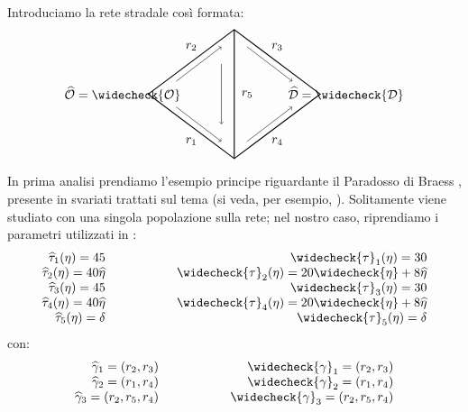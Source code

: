 Introduciamo la rete stradale così formata:
\[
\quad
\begin{tikzpicture}[scale=1.2]

\coordinate (L) at (0,0);
\coordinate (T) at (2,1.5);
\coordinate (R) at (4,0);
\coordinate (B) at (2,-1.5);

\draw[thick] (L) -- (T) -- (R) -- (B) -- cycle;
\draw[thick] (T) -- (B);

\draw[->] (0.65,0.3) -- (1.7,1.1);

\draw[->] (0.65,-0.3) -- (1.7,-1.1);

\draw[->] (2.3,1.1) -- (3.35,0.3);

\draw[->] (2.3,-1.1) -- (3.35,-0.3);

\draw[->] (1.7, 0.7) -- (1.7, -0.7);

\node at (1,1.1) {$r_2$};
\node at (1,-1.1) {$r_1$};
\node at (3,1.1) {$r_3$};
\node at (3,-1.1) {$r_4$};
\node at (2.3, 0) {$r_5$};
\node at (-0.6, 0) {$\widehat{\mathcal{O}} = \widecheck{\mathcal{O}}$};
\node at (4.6, 0) {$\widehat{\mathcal{D}} = \widecheck{\mathcal{D}}$};
\end{tikzpicture}
\quad
\]
In prima analisi prendiamo l'esempio principe riguardante il Paradosso di Braess \cite{BraessParadox}, presente in svariati trattati sul tema (si veda, per esempio, \cite{Easley_Kleinberg_2010}).
Solitamente viene studiato con una singola popolazione sulla rete; nel nostro caso, riprendiamo i parametri utilizzati in \cite[Cap. 3]{MR4911797}:
\begin{equation*}
\begin{array}{r @{\hspace{2cm}} r}

\widehat{\tau}_1(\eta) = 45 &
\widecheck{\tau}_1(\eta) = 30 \\

\widehat{\tau}_2(\eta) = 40\widehat{\eta} &
\widecheck{\tau}_2(\eta) = 20\widecheck{\eta}+8\widehat{\eta} \\

\widehat{\tau}_3(\eta) = 45 &
\widecheck{\tau}_3(\eta) = 30 \\

\widehat{\tau}_4(\eta) = 40\widehat{\eta} &
\widecheck{\tau}_4(\eta) = 20\widecheck{\eta}+8\widehat{\eta} \\

\widehat{\tau}_5(\eta) = \delta &
\widecheck{\tau}_5(\eta) = \delta
$$
\end{array}
\end{equation*}
con:
\begin{equation*}
\begin{array}{r @{\hspace{2cm}} r}

\widehat{\gamma}_1 = (r_2, r_3) &
\widecheck{\gamma}_1 = (r_2, r_3)\\

\widehat{\gamma}_2 = (r_1, r_4) &
\widecheck{\gamma}_2 = (r_1, r_4) \\

\widehat{\gamma}_3 = (r_2, r_5, r_4) &
\widecheck{\gamma}_3 = (r_2, r_5, r_4) 
$$
\end{array}
\end{equation*}

